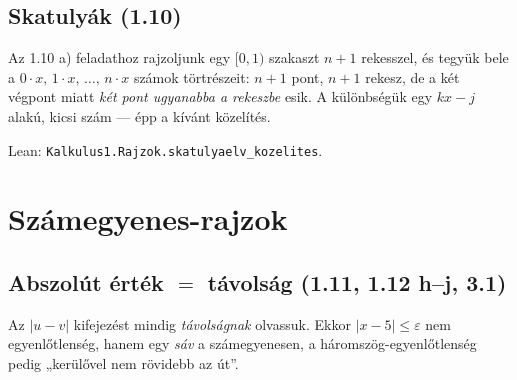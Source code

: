 \documentclass[11pt,a4paper]{article}
\newcommand{\lean}[1]{\texttt{\small #1}}
\newcommand{\eps}{\varepsilon}
\theoremstyle{definition}
\begin{document}
\subsection{Skatulyák (1.10)}

Az 1.10 a) feladathoz rajzoljunk egy $[0,1)$ szakaszt $n+1$ rekesszel, és tegyük bele a
$0\cdot x,\,1\cdot x,\,\dots,\,n\cdot x$ számok törtrészeit: $n+1$ pont, $n+1$ rekesz,
de a két végpont miatt \emph{két pont ugyanabba a rekeszbe} esik. A különbségük egy
$k x - j$ alakú, kicsi szám — épp a kívánt közelítés.

\begin{center}
\end{center}

\noindent Lean: \lean{Kalkulus1.Rajzok.skatulyaelv\_kozelites}.

\section{Számegyenes-rajzok}

\subsection{Abszolút érték $=$ távolság (1.11, 1.12 h--j, 3.1)}

Az $|u-v|$ kifejezést mindig \emph{távolságnak} olvassuk. Ekkor
$|x-5|\le \eps$ nem egyenlőtlenség, hanem egy \emph{sáv} a számegyenesen, a
háromszög-egyenlőtlenség pedig „kerülővel nem rövidebb az út”.
\end{document}
